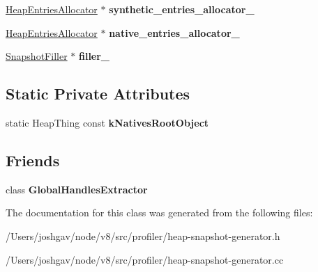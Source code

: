 \begin{DoxyCompactItemize}
\item 
\hyperlink{classv8_1_1internal_1_1_heap_entries_allocator}{Heap\+Entries\+Allocator} $\ast$ {\bfseries synthetic\+\_\+entries\+\_\+allocator\+\_\+}\hypertarget{classv8_1_1internal_1_1_native_objects_explorer_a3db69d9d4c55bf496ef4bbcd0e7e2131}{}\label{classv8_1_1internal_1_1_native_objects_explorer_a3db69d9d4c55bf496ef4bbcd0e7e2131}

\item 
\hyperlink{classv8_1_1internal_1_1_heap_entries_allocator}{Heap\+Entries\+Allocator} $\ast$ {\bfseries native\+\_\+entries\+\_\+allocator\+\_\+}\hypertarget{classv8_1_1internal_1_1_native_objects_explorer_a9c447581e268e46acfb2117cc974b9cf}{}\label{classv8_1_1internal_1_1_native_objects_explorer_a9c447581e268e46acfb2117cc974b9cf}

\item 
\hyperlink{classv8_1_1internal_1_1_snapshot_filler}{Snapshot\+Filler} $\ast$ {\bfseries filler\+\_\+}\hypertarget{classv8_1_1internal_1_1_native_objects_explorer_afe920696370b5fbc8a45cb42617830ab}{}\label{classv8_1_1internal_1_1_native_objects_explorer_afe920696370b5fbc8a45cb42617830ab}

\end{DoxyCompactItemize}
\subsection*{Static Private Attributes}
\begin{DoxyCompactItemize}
\item 
static Heap\+Thing const {\bfseries k\+Natives\+Root\+Object}\hypertarget{classv8_1_1internal_1_1_native_objects_explorer_a4edd79c061a51d317f189d53388626f2}{}\label{classv8_1_1internal_1_1_native_objects_explorer_a4edd79c061a51d317f189d53388626f2}

\end{DoxyCompactItemize}
\subsection*{Friends}
\begin{DoxyCompactItemize}
\item 
class {\bfseries Global\+Handles\+Extractor}\hypertarget{classv8_1_1internal_1_1_native_objects_explorer_afbfc33c11a680509accaad1e0797b32b}{}\label{classv8_1_1internal_1_1_native_objects_explorer_afbfc33c11a680509accaad1e0797b32b}

\end{DoxyCompactItemize}


The documentation for this class was generated from the following files\+:\begin{DoxyCompactItemize}
\item 
/\+Users/joshgav/node/v8/src/profiler/heap-\/snapshot-\/generator.\+h\item 
/\+Users/joshgav/node/v8/src/profiler/heap-\/snapshot-\/generator.\+cc\end{DoxyCompactItemize}
